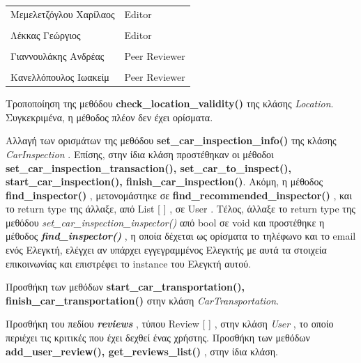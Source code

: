 \documentclass{../ol-softwaremanual}
\begin{document}
	
	\vspace{20pt}
	
	\begin{table}[htbp!]
		\begin{tabular}{ll}
			Μεμελετζόγλου Χαρίλαος & \en Editor \\
			\\ Λέκκας Γεώργιος      &   \en  Editor \\
			\\ Γιαννουλάκης Ανδρέας & \en Peer Reviewer \\
			\\ Κανελλόπουλος Ιωακείμ & \en Peer Reviewer \\ 
		\end{tabular}
	\end{table}
	
	\flushleft
	
	Τροποποίηση της μεθόδου \en\textbf{check\_location\_validity()} \gr της κλάσης \en \textit{Location}\gr. Συγκεκριμένα, η μέθοδος πλέον δεν έχει ορίσματα. \break
	
	Αλλαγή των ορισμάτων της μεθόδου \en\textbf{set\_car\_inspection\_info()} \gr της κλάσης \en \textit{CarInspection} \gr. Επίσης, στην ίδια κλάση προστέθηκαν οι μέθοδοι \en\textbf{set\_car\_inspection\_transaction(), set\_car\_to\_inspect(), start\_car\_inspection(), finish\_car\_inspection()}\gr. Ακόμη, η μέθοδος \en \textbf{find\_inspector()} \gr, μετονομάστηκε σε \en \textbf{find\_recommended\_inspector()} \gr, και το \en return type \gr της άλλαξε, από \en List [ ] \gr, σε \en User \gr. Τέλος, άλλαξε το \en return type \gr της μεθόδου \en\textit{set\_car\_inspection\_inspector()} \gr από \en bool \gr σε \en void \gr και προστέθηκε η μέθοδος \en \textbf{\textit{find\_inspector()}} \gr, η οποία δέχεται ως ορίσματα το τηλέφωνο και το \en email \gr ενός Ελεγκτή, ελέγχει αν υπάρχει εγγεγραμμένος Ελεγκτής με αυτά τα στοιχεία επικοινωνίας και επιστρέφει το \en instance \gr του Ελεγκτή αυτού. \break
	
	Προσθήκη των μεθόδων \en\textbf{start\_car\_transportation(), finish\_car\_transportation()} \gr στην κλάση \en \textit{CarTransportation}\gr. \break
	
	Προσθήκη του πεδίου \en \textbf{\textit{reviews}} \gr, τύπου \en Review [ ] \gr, στην κλάση \en \textit{User} \gr, το οποίο περιέχει τις κριτικές που έχει δεχθεί ένας χρήστης. Προσθήκη των μεθόδων \en\textbf{add\_user\_review(), get\_reviews\_list()} \gr, στην ίδια κλάση. \break
	
\end{document}
